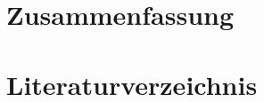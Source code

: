 \documentclass{scrartcl}
\begin{document}
\begin{onehalfspace}
\section{Zusammenfassung}

\newpage
{}
\setcounter{page}{1}
\section{Literaturverzeichnis}





\end{onehalfspace}
\end{document}
